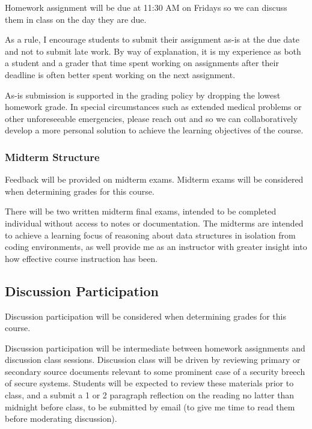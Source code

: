 \documentclass[11pt]{article}
\begin{document}
\bigskip
\noindent Homework assignment will be due at 11:30 AM on Fridays so we can discuss them in class on the 
day they are due.

\bigskip
\noindent As a rule, I encourage students to submit their assignment as-is at the due date and not to
submit late work. By way of explanation, it is my experience as both a student and a grader that time spent working on assignments after their deadline is often better spent working on the next assignment.

\bigskip
\noindent As-is submission is supported in the grading policy by dropping the lowest homework
grade. In special circumstances such as extended medical problems or other unforeseeable
emergencies, please reach out and so we can collaboratively develop a more personal
solution to achieve the learning objectives of the course.

\subsubsection*{Midterm Structure}

Feedback will be provided on midterm exams.  Midterm exams will be considered when determining grades for this course.

\bigskip
\noindent There will be two written midterm final exams, intended to be completed individual
without access to notes or documentation. The midterms are intended to achieve a learning
focus of reasoning about data structures in isolation from coding environments,
as well provide me as an instructor with greater insight into how effective course
instruction has been.

\subsection*{Discussion Participation}

Discussion participation will be considered when determining grades for this course.

Discussion participation will be intermediate between homework assignments and discussion class
sessions. Discussion class will be driven by reviewing primary or secondary source documents relevant to some prominent case of a security breech of secure systems. Students will be expected to review these materials prior to class, and a submit a 1 or 2 paragraph reflection on the reading no latter than midnight before class, to be submitted by email (to give me time to read them before moderating discussion).
\end{document}
